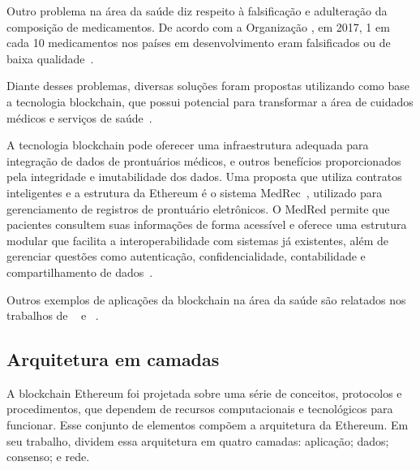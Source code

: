 Outro problema na área da saúde diz respeito à falsificação e adulteração da composição de medicamentos. De acordo com a Organização , em 2017, 1 em cada 10 medicamentos nos países em desenvolvimento eram falsificados ou de baixa qualidade~\cite{oms2017medicamentos}.

Diante desses problemas, diversas soluções foram propostas utilizando como base a tecnologia blockchain, que possui potencial para transformar a área de cuidados médicos e serviços de saúde~. 

A tecnologia blockchain pode oferecer uma infraestrutura adequada para integração de dados de prontuários médicos, e outros benefícios proporcionados pela integridade e imutabilidade dos dados. Uma proposta que utiliza contratos inteligentes e a estrutura da Ethereum é o sistema MedRec~\cite{ekblaw2016case-medrec}, utilizado para gerenciamento de registros de prontuário eletrônicos. O MedRed permite que pacientes consultem suas informações de forma acessível e oferece uma estrutura modular que facilita a interoperabilidade com sistemas já existentes, além de gerenciar questões como autenticação, confidencialidade, contabilidade e compartilhamento de dados~\cite{ekblaw2016case-medrec}.

Outros exemplos de aplicações da blockchain na área da saúde são relatados nos trabalhos de ~ e  ~.


\subsection{Arquitetura em camadas} \label{tex:fund:ethereum:camadas}

A blockchain Ethereum foi projetada sobre uma série de conceitos, protocolos e procedimentos, que dependem de recursos computacionais e tecnológicos para funcionar. Esse conjunto de elementos compõem a arquitetura da Ethereum. Em seu trabalho,  dividem essa arquitetura em quatro camadas: aplicação; dados; consenso; e rede. 

